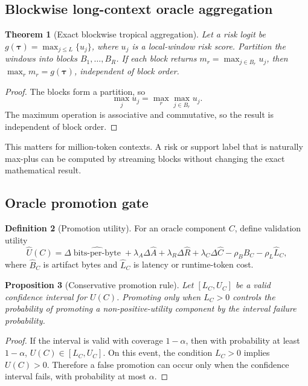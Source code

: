 \documentclass[11pt]{article}
\newtheorem{theorem}{Theorem}[section]
\newtheorem{proposition}[theorem]{Proposition}
\theoremstyle{definition}
\newtheorem{definition}[theorem]{Definition}
\theoremstyle{remark}
\newcommand{\traj}{\boldsymbol{\tau}}
\newcommand{\bits}{\operatorname{bits\mbox{-}per\mbox{-}byte}}
\numberwithin{equation}{section}
\begin{document}
\subsection{Blockwise long-context oracle aggregation}

\begin{theorem}[Exact blockwise tropical aggregation]
Let a risk logit be \(g(\traj)=\max_{j\le L}\{u_j\}\), where \(u_j\) is a local-window risk score.  Partition the windows into blocks \(B_1,\ldots,B_R\).  If each block returns \(m_r=\max_{j\in B_r}u_j\), then \(\max_r m_r=g(\traj)\), independent of block order.
\end{theorem}
\begin{proof}
The blocks form a partition, so
\begin{equation}
\max_j u_j=\max_r\max_{j\in B_r}u_j.
\end{equation}
The maximum operation is associative and commutative, so the result is independent of block order.
\end{proof}

This matters for million-token contexts.  A risk or support label that is naturally max-plus can be computed by streaming blocks without changing the exact mathematical result.

\subsection{Oracle promotion gate}

\begin{definition}[Promotion utility]
For an oracle component \(C\), define validation utility
\begin{equation}
    \widehat U(C)=\Delta \widehat{\bits}+\lambda_A\Delta \widehat A+\lambda_R\Delta \widehat R+\lambda_C\Delta \widehat C-\rho_B\widehat B_C-\rho_L\widehat L_C,
\end{equation}
where \(\widehat B_C\) is artifact bytes and \(\widehat L_C\) is latency or runtime-token cost.
\end{definition}

\begin{proposition}[Conservative promotion rule]
Let \([L_C,U_C]\) be a valid confidence interval for \(U(C)\).  Promoting only when \(L_C>0\) controls the probability of promoting a non-positive-utility component by the interval failure probability.
\end{proposition}
\begin{proof}
If the interval is valid with coverage \(1-\alpha\), then with probability at least \(1-\alpha\), \(U(C)\in[L_C,U_C]\).  On this event, the condition \(L_C>0\) implies \(U(C)>0\).  Therefore a false promotion can occur only when the confidence interval fails, with probability at most \(\alpha\).
\end{proof}
\end{document}
